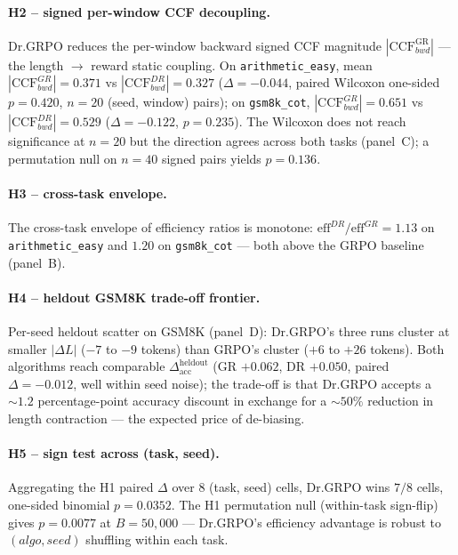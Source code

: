 \paragraph{H2 -- signed per-window CCF decoupling.}
Dr.GRPO reduces the per-window backward signed CCF magnitude
$|\mathrm{CCF}^{\mathrm{GR}}_{bwd}|$ --- the length $\to$ reward
static coupling.  On \texttt{arithmetic\_easy}, mean
$|\mathrm{CCF}^{GR}_{bwd}|=0.371$ vs $|\mathrm{CCF}^{DR}_{bwd}|=0.327$
($\Delta = -0.044$, paired Wilcoxon one-sided $p = 0.420$,
$n{=}20$ (seed, window) pairs); on \texttt{gsm8k\_cot},
$|\mathrm{CCF}^{GR}_{bwd}|=0.651$ vs $|\mathrm{CCF}^{DR}_{bwd}|=0.529$
($\Delta = -0.122$, $p = 0.235$).  The Wilcoxon does not reach
significance at $n{=}20$ but the direction agrees across both tasks
(panel~C); a permutation null on $n{=}40$ signed pairs yields
$p = 0.136$.

\paragraph{H3 -- cross-task envelope.}
The cross-task envelope of efficiency ratios is monotone: $\mathrm{eff}^{DR}/\mathrm{eff}^{GR} = 1.13$
on \texttt{arithmetic\_easy} and $1.20$ on \texttt{gsm8k\_cot} ---
both above the GRPO baseline (panel~B).

\paragraph{H4 -- heldout GSM8K trade-off frontier.}
Per-seed heldout scatter on GSM8K (panel~D): Dr.GRPO's three runs
cluster at smaller $|\Delta L|$ ($-7$ to $-9$ tokens) than GRPO's
cluster ($+6$ to $+26$ tokens).  Both algorithms reach comparable
$\Delta_{\mathrm{acc}}^{\mathrm{heldout}}$ (GR $+0.062$, DR $+0.050$,
paired $\Delta = -0.012$, well within seed noise); the trade-off is
that Dr.GRPO accepts a $\sim 1.2$ percentage-point accuracy
discount in exchange for a $\sim 50\%$ reduction in length
contraction --- the expected price of de-biasing.

\paragraph{H5 -- sign test across (task, seed).}
Aggregating the H1 paired $\Delta$ over 8 (task, seed) cells,
Dr.GRPO wins $7/8$ cells, one-sided binomial $p = 0.0352$.
The H1 permutation null (within-task sign-flip) gives
$p = 0.0077$ at $B{=}50{,}000$ --- Dr.GRPO's efficiency advantage is
robust to $(algo, seed)$ shuffling within each task.

